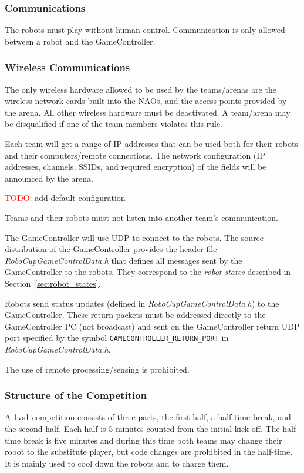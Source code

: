 \subsubsection{Communications}

The robots must play without human control. Communication is only allowed between a robot and the GameController.

\subsubsection{Wireless Communications}
\label{sec:wireless}
The only wireless hardware allowed to be used by the teams/arenas are the wireless network cards built into the NAOs, and the access points provided by the arena. All other wireless hardware must be deactivated. A team/arena may be disqualified if one of the team members violates this rule.

Each team will get a range of IP addresses that can be used both for their robots and their computers/remote connections. The network configuration (\eg IP addresses, channels, SSIDs, and required encryption) of the fields will be announced by the arena. 

\textcolor{red}{TODO}: add default configuration

Teams and their robots must not listen into another team's communication.

The GameController will use UDP to connect to the robots. The source distribution of the GameController provides the header file \emph{RoboCupGameControlData.h} that defines all messages sent by the GameController to the robots. They correspond to the \emph{robot states} described in Section~\ref{sec:robot_states}.

Robots send status updates (defined in \emph{RoboCupGameControlData.h}) to the GameController. These return packets must be addressed directly to the GameController PC (\ie not broadcast) and sent on the GameController return UDP port specified by the symbol \verb!GAMECONTROLLER_RETURN_PORT! in \emph{RoboCupGameControlData.h}.

The use of remote processing/sensing is prohibited.

\subsubsection{Structure of the Competition}
\label{sec:game_struct}

A 1vs1 competition consists of three parts, the first half, a half-time break, and the second half. Each half is 5 minutes counted from the initial kick-off.
The half-time break is five minutes and during this time both teams may change their robot to the substitute player, but code changes are prohibited in the half-time. It is mainly used to cool down the robots and to charge them. 


